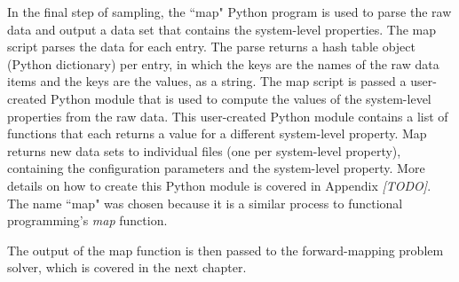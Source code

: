 In the final step of sampling, the ``map" Python program is used to parse the raw data and output a data set that contains the system-level properties.
The map script parses the data for each entry.
The parse returns a hash table object (Python dictionary) per entry, in which the keys are the names of the raw data items and the keys are the values, as a string.
The map script is passed a user-created Python module that is used to compute the values of the system-level properties from the raw data.
This user-created Python module contains a list of functions that each returns a value for a different system-level property.
Map returns new data sets to individual files (one per system-level property), containing the configuration parameters and the system-level property.
More details on how to create this Python module is covered in Appendix \textit{[TODO]}.
The name ``map" was chosen because it is a similar process to functional programming's \textit{map} function.

The output of the map function is then passed to the forward-mapping problem solver, which is covered in the next chapter.







